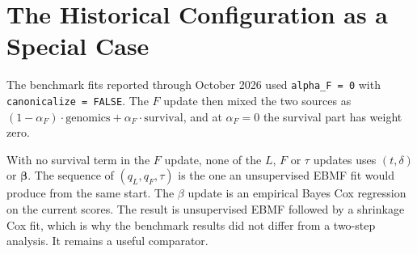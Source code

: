 \documentclass[11pt]{article}
\begin{document}
\section{The Historical Configuration as a Special Case}\label{sec:historical}

The benchmark fits reported through October 2026 used
\texttt{alpha\_F = 0} with \texttt{canonicalize = FALSE}. The $F$ update then
mixed the two sources as $(1-\alpha_F)\cdot\text{genomics} + \alpha_F\cdot\text{survival}$,
and at $\alpha_F = 0$ the survival part has weight zero.

\begin{keybox}[At $\alpha_F = 0$ the fit is a two-step method]
With no survival term in the $F$ update, none of the $L$, $F$ or $\tau$ updates
uses $(t,\delta)$ or $\bm\beta$. The sequence of $(q_L, q_F, \tau)$ is the one an
unsupervised EBMF fit would produce from the same start. The $\beta$ update is
an empirical Bayes Cox regression on the current scores. The result is
unsupervised EBMF followed by a shrinkage Cox fit, which is why the benchmark
results did not differ from a two-step analysis. It remains a useful comparator.
\end{keybox}
\end{document}
